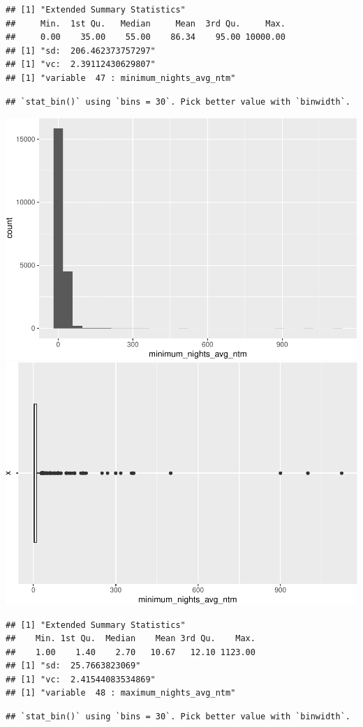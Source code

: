 \begin{verbatim}
## [1] "Extended Summary Statistics"
##     Min.  1st Qu.   Median     Mean  3rd Qu.     Max. 
##     0.00    35.00    55.00    86.34    95.00 10000.00 
## [1] "sd:  206.462373757297"
## [1] "vc:  2.39112430629807"
## [1] "variable  47 : minimum_nights_avg_ntm"
\end{verbatim}

\begin{verbatim}
## `stat_bin()` using `bins = 30`. Pick better value with `binwidth`.
\end{verbatim}

\includegraphics[width=0.5\linewidth]{anal_files/figure-latex/figures-side-24}
\includegraphics[width=0.5\linewidth]{anal_files/figure-latex/figures-side-25}

\begin{verbatim}
## [1] "Extended Summary Statistics"
##    Min. 1st Qu.  Median    Mean 3rd Qu.    Max. 
##    1.00    1.40    2.70   10.67   12.10 1123.00 
## [1] "sd:  25.7663823069"
## [1] "vc:  2.41544083534869"
## [1] "variable  48 : maximum_nights_avg_ntm"
\end{verbatim}

\begin{verbatim}
## `stat_bin()` using `bins = 30`. Pick better value with `binwidth`.
\end{verbatim}

